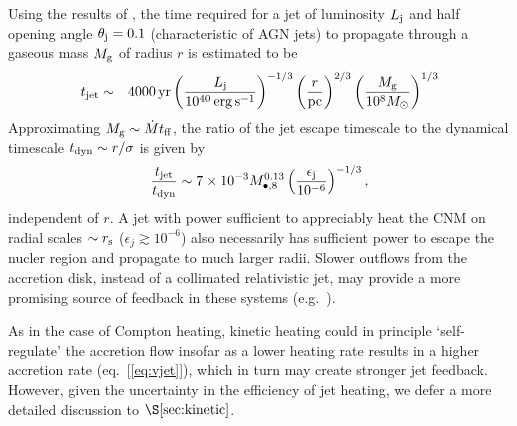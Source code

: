 \documentclass[usenatbib,fleqn]{mn2e}
\begin{document}
Using the results of \citet{Bromberg+11}, the time required for a jet of luminosity $L_{\rm
  j}$ and half opening angle $\theta_{\rm j} = 0.1$ (characteristic of
AGN jets) to propagate through a gaseous mass $M_{\rm g}$ of radius $r$ is estimated to be
\begin{eqnarray}
t_{\rm jet} &\sim& 4000\,{\rm yr}\left(\frac{{L}_{\rm j}}{10^{40}\,\rm erg\,s^{-1}}\right)^{-1/3}\left(\frac{r}{\rm pc}\right)^{2/3}\left(\frac{M_{\rm g}}{10^{8}M_{\odot}}\right)^{1/3} 
\end{eqnarray}
Approximating $M_{\rm g} \sim \dot{M}t_{\rm ff}$, the ratio of the jet escape timescale to the dynamical timescale $t_{\rm dyn} \sim r/\sigma$ is given by
\begin{equation}
\frac{t_{\rm jet}}{t_{\rm dyn}} \sim 7\times 10^{-3}M_{\bullet,8}^{0.13}\left(\frac{\epsilon_{\rm j}}{10^{-6}}\right)^{-1/3},
\end{equation}
independent of $r$.  A jet with power sufficient to appreciably heat the CNM on radial scales $\sim r_{\rm s}$ ($\epsilon_{j} \gtrsim 10^{-6}$) also necessarily has sufficient power to escape the nucler region and propagate to much larger radii.  Slower outflows from the accretion disk, instead of a collimated relativistic jet, may provide a more promising source of feedback in these systems (e.g.~\citealt{Li+13}).    

As in the case of Compton heating, kinetic heating could in principle  `self-regulate' the accretion flow insofar as a lower heating rate results in a higher accretion rate (eq.~[\ref{eq:vjet}]), which in turn may create stronger jet feedback.  However, given the uncertainty in the efficiency of jet heating, we defer a more detailed discussion to $\S\ref{sec:kinetic}$.
\end{document}
